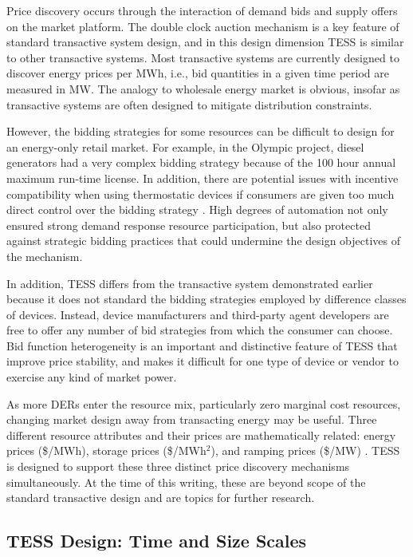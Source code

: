 Price discovery occurs through the interaction of demand bids and supply offers on the market platform. The double clock auction mechanism is a key feature of standard transactive system design, and in this design dimension TESS is similar to other transactive systems. Most transactive systems are currently designed to discover energy prices per MWh, i.e., bid quantities in a given time period are measured in MW.  The analogy to wholesale energy market is obvious, insofar as transactive systems are often designed to mitigate distribution constraints.

However, the bidding strategies for some resources can be difficult to design for an energy-only retail market. For example, in the Olympic project, diesel generators had a very complex bidding strategy because of the 100 hour annual maximum run-time license.  In addition, there are potential issues with incentive compatibility when using thermostatic devices if consumers are given too much direct control over the bidding strategy \citep{li2020transactive}. High degrees of automation not only ensured strong demand response resource participation, but also protected against strategic bidding practices that could undermine the design objectives of the mechanism.

In addition, TESS differs from the transactive system demonstrated earlier because it does not standard the bidding strategies employed by difference classes of devices.  Instead, device manufacturers and third-party agent developers are free to offer any number of bid strategies from which the consumer can choose.  Bid function heterogeneity is an important and distinctive feature of TESS that improve price stability, and makes it difficult for one type of device or vendor to exercise any kind of market power.

As more DERs enter the resource mix, particularly zero marginal cost resources, changing market design away from transacting energy may be useful. Three different resource attributes and their prices are mathematically related: energy prices (\$/MWh), storage prices (\$/MWh$^2$), and ramping prices (\$/MW) \citep{chassin2017thesis}. TESS is designed to support these three distinct price discovery mechanisms simultaneously. At the time of this writing, these are beyond scope of the standard transactive design and are topics for further research.

\subsection{TESS Design: Time and Size Scales}\label{sec:time_scales}

